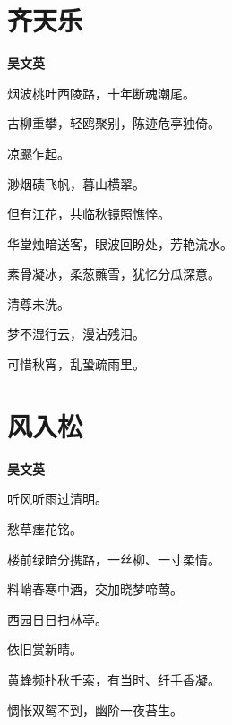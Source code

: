 \documentclass[12pt,a4paper]{ctexbook}
\begin{document}
\section{齐天乐}
\textbf{吴文英}\par\vspace{0.5em}
烟波桃叶西陵路，十年断魂潮尾。\par
古柳重攀，轻鸥聚别，陈迹危亭独倚。\par
凉颸乍起。\par
渺烟碛飞帆，暮山横翠。\par
但有江花，共临秋镜照憔悴。\par
华堂烛暗送客，眼波回盼处，芳艳流水。\par
素骨凝冰，柔葱蘸雪，犹忆分瓜深意。\par
清尊未洗。\par
梦不湿行云，漫沾残泪。\par
可惜秋宵，乱蛩疏雨里。\par

\section{风入松}
\textbf{吴文英}\par\vspace{0.5em}
听风听雨过清明。\par
愁草瘗花铭。\par
楼前绿暗分携路，一丝柳、一寸柔情。\par
料峭春寒中酒，交加晓梦啼莺。\par
西园日日扫林亭。\par
依旧赏新晴。\par
黄蜂频扑秋千索，有当时、纤手香凝。\par
惆怅双鸳不到，幽阶一夜苔生。\par
\end{document}
